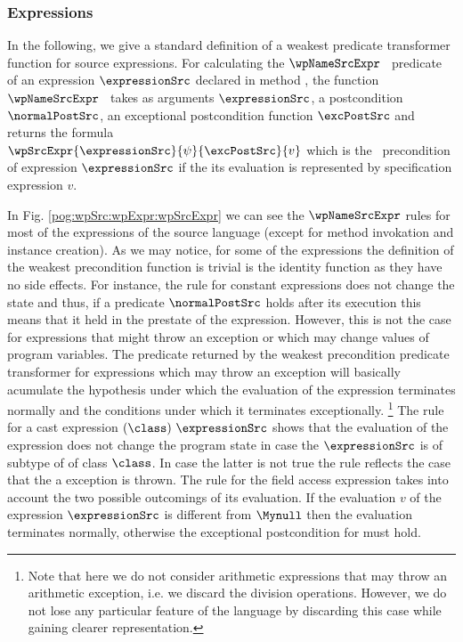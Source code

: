 \subsubsection{Expressions}\label{pog:wpSrc:wpExpr}
In the following, we  give a standard  definition of a weakest
predicate transformer function for source expressions. %
For calculating the  $\wpNameSrcExpr$ \ predicate  of  an expression $\expressionSrc$ declared in method \methodd,
 the function $\wpNameSrcExpr$ \ takes as arguments  $\expressionSrc$, a postcondition $\normalPostSrc$, an exceptional postcondition 
function $\excPostSrc$  and 
  returns the    formula \\
$\wpSrcExpr{\expressionSrc}{\psi}{\excPostSrc}{ v }$ which is the \wpName \ precondition of expression $\expressionSrc$ 
if the its evaluation is represented by  specification expression $v$.  

In Fig. \ref{pog:wpSrc:wpExpr:wpSrcExpr} we can see the $\wpNameSrcExpr$ rules for  most of the expressions of the source language (except for method invokation 
and instance creation). As we may notice, for some of the expressions   
the definition of the weakest precondition function is trivial is the identity function
 as they have  no side effects. For instance, the rule for constant expressions does not change the state and thus,
 if a predicate $ \normalPostSrc$ holds
 after its execution this means that it held in the prestate of the expression. 
 However, this is not the case for expressions that might throw an exception or which may change values of program variables.
 The predicate returned by the weakest precondition predicate transformer for expressions which may throw an exception 
will basically acumulate the hypothesis under which the evaluation 
of the expression terminates normally and the  conditions under which it  terminates exceptionally.
\footnote{Note that here we do not consider arithmetic expressions that may throw
an arithmetic exception, i.e. we discard the division operations.
 However,   we do not lose any particular feature of the language by discarding this case 
while gaining clearer representation.} The rule for a cast expression $( \class ) \ \expressionSrc$ shows that the evaluation of the expression
does not change the program state in case the $ \expressionSrc$ is of subtype of of class  $\class$. In case the latter is not true 
the rule reflects the case that the a  \ClassCastExc{} exception is thrown. The rule for the field access expression takes into account
the two possible  outcomings of its evaluation. If the evaluation $v$ of the expression $\expressionSrc$ 
is different from $\Mynull$ then the evaluation terminates normally, otherwise the exceptional postcondition  
for \NullPointerExc{}  must hold.

